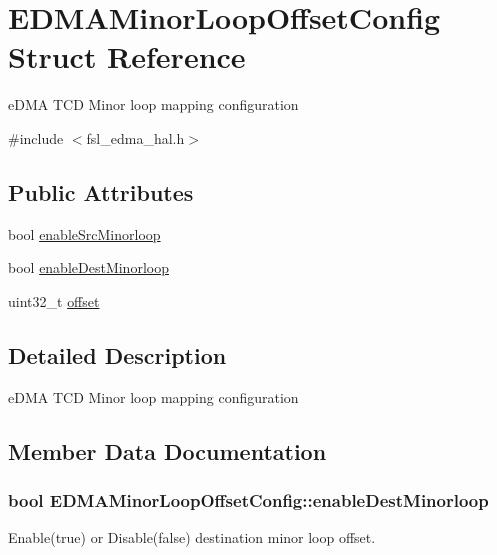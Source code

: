 \hypertarget{structEDMAMinorLoopOffsetConfig}{}\section{E\+D\+M\+A\+Minor\+Loop\+Offset\+Config Struct Reference}
\label{structEDMAMinorLoopOffsetConfig}


e\+D\+MA T\+CD Minor loop mapping configuration  




{\ttfamily \#include $<$fsl\+\_\+edma\+\_\+hal.\+h$>$}

\subsection*{Public Attributes}
\begin{DoxyCompactItemize}
\item 
bool \hyperlink{structEDMAMinorLoopOffsetConfig_a872697ec8728395db0285c382b48a347}{enable\+Src\+Minorloop}
\item 
bool \hyperlink{structEDMAMinorLoopOffsetConfig_adf3857ad15c795a816ffb2c6daa4b6c7}{enable\+Dest\+Minorloop}
\item 
uint32\+\_\+t \hyperlink{structEDMAMinorLoopOffsetConfig_acfc1751f75d04d7e484d65589a3d4197}{offset}
\end{DoxyCompactItemize}


\subsection{Detailed Description}
e\+D\+MA T\+CD Minor loop mapping configuration 

\subsection{Member Data Documentation}
\subsubsection[{\texorpdfstring{enable\+Dest\+Minorloop}{enableDestMinorloop}}]{\setlength{\rightskip}{0pt plus 5cm}bool E\+D\+M\+A\+Minor\+Loop\+Offset\+Config\+::enable\+Dest\+Minorloop}\hypertarget{structEDMAMinorLoopOffsetConfig_adf3857ad15c795a816ffb2c6daa4b6c7}{}\label{structEDMAMinorLoopOffsetConfig_adf3857ad15c795a816ffb2c6daa4b6c7}
Enable(true) or Disable(false) destination minor loop offset. 
